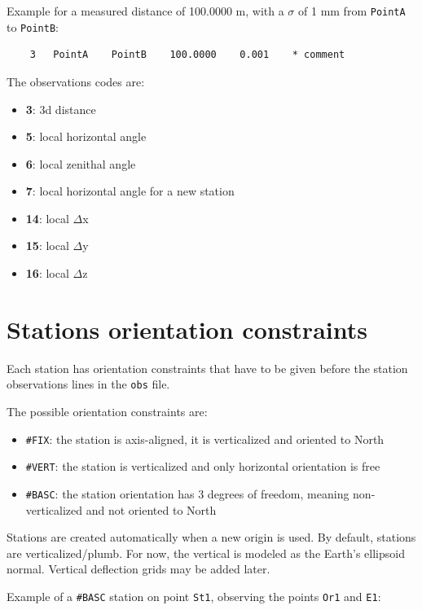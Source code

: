 Example for a measured distance of 100.0000 m, with a $\sigma$ of 1 mm from \texttt{PointA} to \texttt{PointB}:

\begin{verbatim}
    3   PointA    PointB    100.0000    0.001    * comment
\end{verbatim}

The observations codes are:

\begin{itemize}
    \item \textbf{3}: 3d distance
    \item \textbf{5}: local horizontal angle
    \item \textbf{6}: local zenithal angle
    \item \textbf{7}: local horizontal angle for a new station 
    \item \textbf{14}: local $\Delta$x
    \item \textbf{15}: local $\Delta$y
    \item \textbf{16}: local $\Delta$z
\end{itemize}

\section{Stations orientation constraints}

Each station has orientation constraints that have to be given before the station observations lines in the {\tt {obs}} file.

The possible orientation constraints are:
\begin{itemize}
   \item \texttt{\#FIX}: the station is axis-aligned, it is verticalized and oriented to North
   \item \texttt{\#VERT}: the station is verticalized and only horizontal orientation is free
   \item \texttt{\#BASC}: the station orientation has 3 degrees of freedom, meaning non-verticalized and not oriented to North
\end{itemize}


Stations are created automatically when a new origin is used.
By default, stations are verticalized/plumb. For now, the vertical is modeled as the Earth's ellipsoid normal. Vertical deflection grids may be added later.

Example of a \texttt{\#BASC} station on point \texttt{St1}, observing the points \texttt{Or1} and \texttt{E1}:

